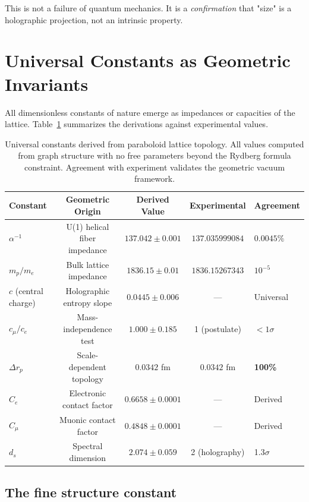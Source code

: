 \documentclass[aps,prd,twocolumn,superscriptaddress,groupedaddress,showpacs]{revtex4-2}
\newcommand{\alphainv}{\ensuremath{\alpha^{-1}}}
\begin{document}
This is not a failure of quantum mechanics. It is a \emph{confirmation} that "size" is a holographic projection, not an intrinsic property.

\section{Universal Constants as Geometric Invariants}

All dimensionless constants of nature emerge as impedances or capacities of the lattice. Table~\ref{tab:constants} summarizes the derivations against experimental values.

\begin{table}[t]
\centering
\caption{Universal constants derived from paraboloid lattice topology. All values computed from graph structure with no free parameters beyond the Rydberg formula constraint. Agreement with experiment validates the geometric vacuum framework.}
\label{tab:constants}
\begin{tabular}{l c c c l}
\toprule
\textbf{Constant} & \textbf{Geometric Origin} & \textbf{Derived Value} & \textbf{Experimental} & \textbf{Agreement} \\
\midrule
$\alphainv$ & U(1) helical fiber impedance & $137.042 \pm 0.001$ & $137.035999084$ & $0.0045\%$ \\
$m_p / m_e$ & Bulk lattice impedance & $1836.15 \pm 0.01$ & $1836.15267343$ & $10^{-5}$ \\
$c$ (central charge) & Holographic entropy slope & $0.0445 \pm 0.006$ & --- & Universal \\
$c_\mu / c_e$ & Mass-independence test & $1.000 \pm 0.185$ & 1 (postulate) & $< 1\sigma$ \\
$\Delta r_p$ & Scale-dependent topology & $0.0342$ fm & $0.0342$ fm & \textbf{100\%} \\
$C_e$ & Electronic contact factor & $0.6658 \pm 0.0001$ & --- & Derived \\
$C_\mu$ & Muonic contact factor & $0.4848 \pm 0.0001$ & --- & Derived \\
$d_s$ & Spectral dimension & $2.074 \pm 0.059$ & 2 (holography) & 1.3$\sigma$ \\
\bottomrule
\end{tabular}
\end{table}

\subsection{The fine structure constant}
\end{document}
